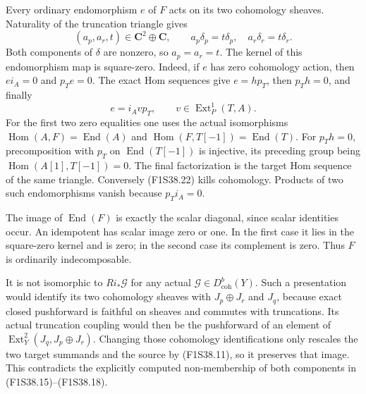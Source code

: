 Every ordinary endomorphism $e$ of $F$ acts on its two
cohomology sheaves. Naturality of the truncation triangle gives
\[
 (a_p,a_r,t)\in\mathbf C^2\oplus\mathbf C,
       \qquad a_p\delta_p=t\delta_p,\quad
                       a_r\delta_r=t\delta_r.
 \tag{F1S38.21}
\]
Both components of $\delta$ are nonzero, so $a_p=a_r=t$.
The kernel of this endomorphism map is square-zero.
Indeed, if $e$ has zero cohomology action, then
$ei_A=0$ and $p_Te=0$. The exact Hom sequences give
$e=h p_T$, then $p_T h=0$, and finally
\[
                    e=i_A v p_T,
                 \qquad v\in\operatorname{Ext}^1_P(T,A).
 \tag{F1S38.22}
\]
For the first two zero equalities one uses the actual
isomorphisms $\operatorname{Hom}(A,F)=\operatorname{End}(A)$
and $\operatorname{Hom}(F,T[-1])=\operatorname{End}(T)$.
For $p_T h=0$, precomposition with $p_T$ on
$\operatorname{End}(T[-1])$ is injective, its preceding
group being $\operatorname{Hom}(A[1],T[-1])=0$.
The final factorization is the target Hom sequence of the
same triangle. Conversely (F1S38.22) kills cohomology.
Products of two such endomorphisms vanish because
$p_Ti_A=0$.

The image of $\operatorname{End}(F)$ is exactly the scalar
diagonal, since scalar identities occur. An idempotent has
scalar image zero or one. In the first case it lies in the
square-zero kernel and is zero; in the second case its
complement is zero. Thus $F$ is ordinarily indecomposable.

It is not isomorphic to $Ri_*\mathcal G$ for any actual
$\mathcal G\in D^b_{\mathrm{coh}}(Y)$.
Such a presentation would identify its two cohomology sheaves
with $J_p\oplus J_r$ and $J_q$, because exact closed pushforward
is faithful on sheaves and commutes with truncations.
Its actual truncation coupling would then be the pushforward
of an element of
$\operatorname{Ext}^2_Y(J_q,J_p\oplus J_r)$.
Changing those cohomology identifications only rescales the
two target summands and the source by (F1S38.11), so it preserves
that image. This contradicts the explicitly computed
non-membership of both components in (F1S38.15)--(F1S38.18).

